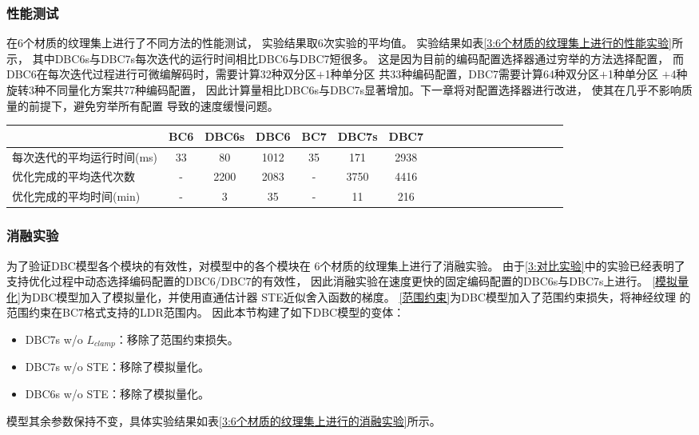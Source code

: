 \subsubsection{性能测试}
\label{3:性能测试}
在6个材质的纹理集上进行了不同方法的性能测试，
实验结果取6次实验的平均值。
实验结果如表\ref{3:6个材质的纹理集上进行的性能实验}所示，
其中DBC6s与DBC7s每次迭代的运行时间相比DBC6与DBC7短很多。
这是因为目前的编码配置选择器通过穷举的方法选择配置，
而DBC6在每次迭代过程进行可微编解码时，需要计算32种双分区$+$1种单分区
共33种编码配置，DBC7需要计算64种双分区$+$1种单分区
$+$4种旋转\times3种不同量化方案共77种编码配置，
因此计算量相比DBC6s与DBC7s显著增加。下一章将对配置选择器进行改进，
使其在几乎不影响质量的前提下，避免穷举所有配置
导致的速度缓慢问题。

\begin{table*}[htbp]
    \centering
    \caption{6个材质的纹理集上进行的性能实验}
    \label{3:6个材质的纹理集上进行的性能实验}        
    \begin{tabular}{lcccccccccccccccccc}
        \toprule
                                    & BC6 & DBC6s & DBC6 & BC7  & DBC7s & DBC7 \\
        \midrule
        每次迭代的平均运行时间(ms)  & 33  &  80    & 1012 & 35   & 171   &  2938 \\
        优化完成的平均迭代次数      & -   &  2200  & 2083 & -   & 3750   &  4416 \\
        优化完成的平均时间(min)     & -   &  3     & 35   & -   & 11      &  216\\
        \bottomrule
\end{tabular} %
\end{table*}

\subsubsection{消融实验}

为了验证DBC模型各个模块的有效性，对模型中的各个模块在
6个材质的纹理集上进行了消融实验。
由于\ref{3:对比实验}中的实验已经表明了支持优化过程中动态选择编码配置的DBC6/DBC7的有效性，
因此消融实验在速度更快的固定编码配置的DBC6s与DBC7s上进行。
\ref{模拟量化}为DBC模型加入了模拟量化，并使用直通估计器
STE\cite{bengio2013estimating}近似舍入函数的梯度。
\ref{范围约束}为DBC模型加入了范围约束损失，将神经纹理
的范围约束在BC7格式支持的LDR范围内。
因此本节构建了如下DBC模型的变体：
\begin{itemize}
    \item DBC7s w/o $L_{clamp}$：移除了范围约束损失。
    \item DBC7s w/o STE：移除了模拟量化。
    \item DBC6s w/o STE：移除了模拟量化。
\end{itemize}
模型其余参数保持不变，具体实验结果如表\ref{3:6个材质的纹理集上进行的消融实验}所示。

